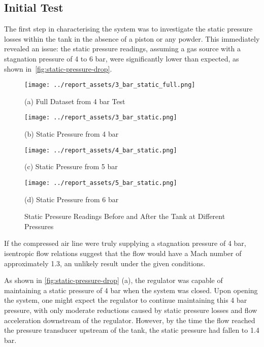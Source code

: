 \subsection{Initial Test}
The first step in characterising the system was to investigate the static pressure losses within the tank in the absence of a piston or any powder. This immediately revealed an issue: the static pressure readings, assuming a gas source with a stagnation pressure of 4 to 6 bar, were significantly lower than expected, as shown in~\autoref{fig:static-pressure-drop}.
\begin{figure}[htbp]
    \centering

    \begin{minipage}{0.45\textwidth}
        \centering
        \texttt{[image: ../report\_assets/3\_bar\_static\_full.png]}
        \caption*{(a) Full Dataset from 4 bar Test}
    \end{minipage}    
    \hfill
    \begin{minipage}{0.45\textwidth}
        \centering
        \texttt{[image: ../report\_assets/3\_bar\_static.png]}
        \caption*{(b) Static Pressure from 4 bar}
    \end{minipage}    
    \begin{minipage}{0.45\textwidth}
        \centering
        \texttt{[image: ../report\_assets/4\_bar\_static.png]}
        \caption*{(c) Static Pressure from 5 bar}
    \end{minipage}    
    \hfill
    \begin{minipage}{0.45\textwidth}
        \centering
        \texttt{[image: ../report\_assets/5\_bar\_static.png]}
        \caption*{(d) Static Pressure from 6 bar}
    \end{minipage}    

    \caption{Static Pressure Readings Before and After the Tank at Different Pressures}\label{fig:static-pressure-drop}
\end{figure}    
If the compressed air line were truly supplying a stagnation pressure of 4 bar, isentropic flow relations suggest that the flow would have a Mach number of approximately 1.3, an unlikely result under the given conditions.

As shown in \autoref{fig:static-pressure-drop} (a), the regulator was capable of maintaining a static pressure of 4 bar when the system was closed. Upon opening the system, one might expect the regulator to continue maintaining this 4 bar pressure, with only moderate reductions caused by static pressure losses and flow acceleration downstream of the regulator. However, by the time the flow reached the pressure transducer upstream of the tank, the static pressure had fallen to 1.4 bar.

